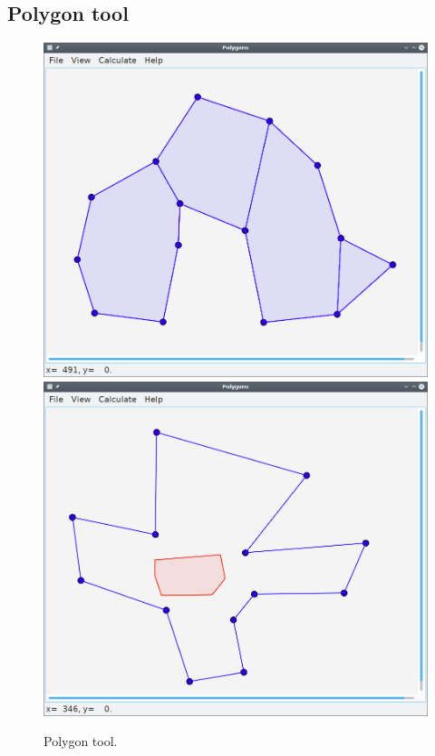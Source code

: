 \subsection{Polygon tool}
\begin{figure}[htb]
	\centering
	\includegraphics[width = 0.49 \textwidth]{figures/polygui_convex}
	\hspace{0.05cm}
	\includegraphics[width = 0.49 \textwidth]{figures/polygui_kernel}
	\caption[Polygon tool.]{Polygon tool.
		\label{fig:linesgui}}
\end{figure}



